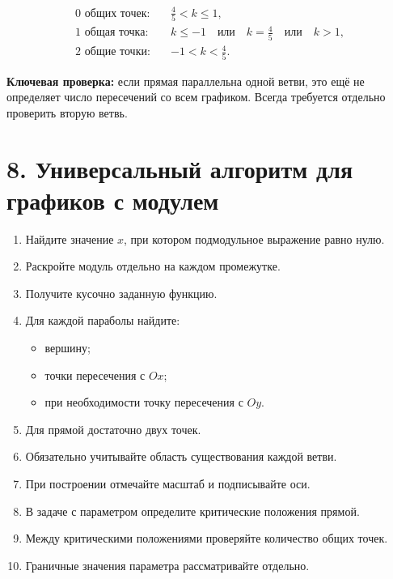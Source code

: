 \documentclass[a4paper,12pt]{article}
\newcommand{\important}[1]{\textcolor{darkaccent}{\textbf{#1}}}
\begin{document}
\[
\boxed{
\begin{aligned}
0\text{ общих точек:}\quad
&
\frac45<k\le1,
\\[0.2cm]
1\text{ общая точка:}\quad
&
k\le-1
\quad\text{или}\quad
k=\frac45
\quad\text{или}\quad
k>1,
\\[0.2cm]
2\text{ общие точки:}\quad
&
-1<k<\frac45.
\end{aligned}
}
\]

\important{Ключевая проверка:}
если прямая параллельна одной ветви,
это ещё не определяет число пересечений со всем графиком.
Всегда требуется отдельно проверить вторую ветвь.


\section*{\textcolor{darkaccent}{
8. Универсальный алгоритм для графиков с модулем
}}

\begin{enumerate}

\item
Найдите значение \(x\), при котором подмодульное выражение
равно нулю.

\item
Раскройте модуль отдельно на каждом промежутке.

\item
Получите кусочно заданную функцию.

\item
Для каждой параболы найдите:

\begin{itemize}
\item вершину;
\item точки пересечения с \(Ox\);
\item при необходимости точку пересечения с \(Oy\).
\end{itemize}

\item
Для прямой достаточно двух точек.

\item
Обязательно учитывайте область существования каждой ветви.

\item
При построении отмечайте масштаб и подписывайте оси.

\item
В задаче с параметром определите критические положения прямой.

\item
Между критическими положениями проверяйте количество общих точек.

\item
Граничные значения параметра рассматривайте отдельно.

\end{enumerate}
\end{document}
